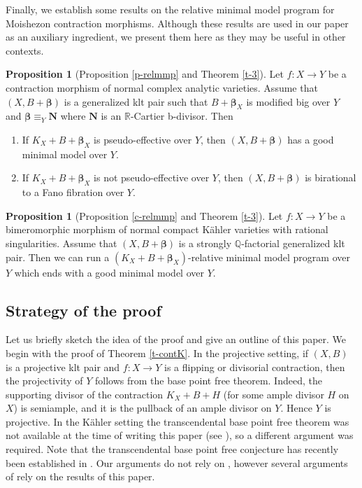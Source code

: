 \documentclass[11pt]{amsart}
\numberwithin{equation}{section}
\def\bbeta{\boldsymbol{\beta}}
\newcommand\Q{{\mathbb{Q}}}
\newcommand\R{{\mathbb{R}}}
\theoremstyle{definition}
\theoremstyle{definition}
\newtheorem{proposition}[theorem]{Proposition}
\theoremstyle{definition}
\begin{document}
Finally, we establish some results on the relative minimal model program for Moishezon contraction morphisms. %
Although these results are used in our paper as an auxiliary ingredient, we present them here as they may be useful in other contexts.

\begin{proposition}[{Proposition \ref{p-relmmp}} and Theorem \ref{t-3}]
Let $f:X\to Y$ be a contraction morphism of normal complex analytic varieties. Assume that $(X,B+\bbeta )$ is a generalized klt pair such that $B+\bbeta_X$ is modified big over $Y$ and $\bbeta \equiv _Y \mathbf N$ where $\mathbf N$ is an $\R$-Cartier b-divisor. Then
\begin{enumerate}\item If $K_X+B+\bbeta_X$ is pseudo-effective over $Y$, then $(X,B+\bbeta)$ has a good minimal model over $Y$.
\item  If $K_X+B+\bbeta_X$ is not pseudo-effective over $Y$, then $(X,B+\bbeta)$ is birational to a Fano fibration  over $Y$.
\end{enumerate}
\end{proposition}

\begin{proposition}[{Proposition \ref{c-relmmp} and Theorem \ref{t-3}}] Let $f:X\to Y$ be a bimeromorphic morphism of normal compact K\"ahler varieties with rational singularities. Assume that $(X,B+\bbeta )$ is a strongly $\Q$-factorial generalized klt pair. %
Then we can run a $(K_X+B+\bbeta_X)$-relative minimal model program over $Y$ which ends with a good minimal model over $Y$.
\end{proposition}



\subsection{Strategy of the proof}
Let us briefly sketch the idea of the proof and give an outline of this paper. We begin with the proof of Theorem \ref{t-contK}. In the projective setting, if $(X,B)$ is a projective klt pair and $f: X \to Y$ is a flipping or divisorial contraction, then the projectivity of $Y$ follows from the base point free theorem. Indeed, the supporting divisor of the contraction $K_X+B+H$ (for some ample divisor $H$ on $X$) is semiample, and it is the pullback of an ample divisor on $Y$. Hence $Y$ is projective. In the K\"ahler setting the transcendental base point free theorem was not available at the time of writing this paper (see \cite[Conjecture~1.6]{DH25}), so a different argument was required. Note that the transcendental base point free conjecture has recently been established in \cite{HX26}. Our arguments do not rely on \cite{HX26}, however several arguments of \cite{HX26} rely on the results of this paper.
\end{document}
